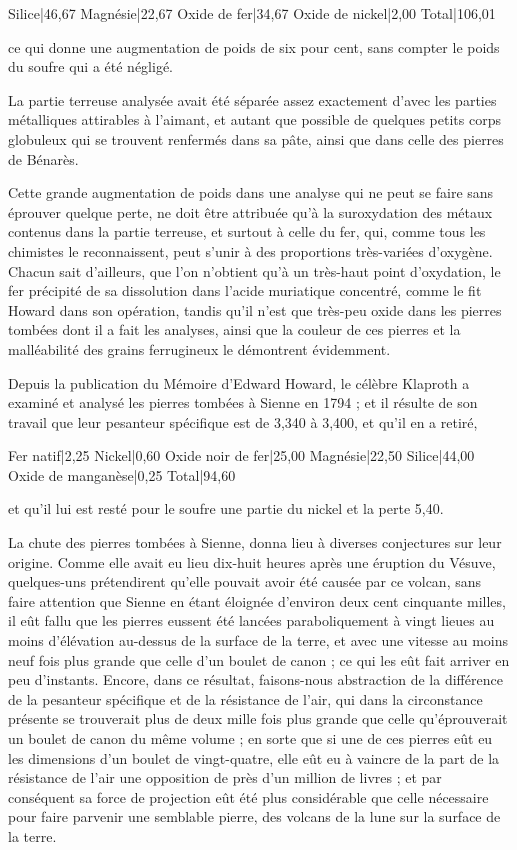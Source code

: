 \documentclass[a4paper, 12pt, oneside, french]{article}
\begin{document}
Silice|46,67  
Magnésie|22,67  
Oxide de fer|34,67  
Oxide de nickel|2,00  
Total|106,01

ce qui donne une augmentation de poids de six pour cent, sans compter le poids du soufre qui a été négligé.

La partie terreuse analysée avait été séparée assez exactement d'avec les parties métalliques attirables à l'aimant, et autant que possible de quelques petits corps globuleux qui se trouvent renfermés dans sa pâte, ainsi que dans celle des pierres de Bénarès.

Cette grande augmentation de poids dans une analyse qui ne peut se faire sans éprouver quelque perte, ne doit être attribuée qu'à la suroxydation des métaux contenus dans la partie terreuse, et surtout à celle du fer, qui, comme tous les chimistes le reconnaissent, peut s'unir à des proportions très-variées d'oxygène. Chacun sait d'ailleurs, que l'on n'obtient qu'à un très-haut point d'oxydation, le fer précipité de sa dissolution dans l'acide muriatique concentré, comme le fit Howard dans son opération, tandis qu'il n'est que très-peu oxide dans les pierres tombées dont il a fait les analyses, ainsi que la couleur de ces pierres et la malléabilité des grains ferrugineux le démontrent évidemment.

Depuis la publication du Mémoire d'Edward Howard, le célèbre Klaproth a examiné et analysé les pierres tombées à Sienne en 1794 ; et il résulte de son travail que leur pesanteur spécifique est de 3,340 à 3,400, et qu'il en a retiré,

Fer natif|2,25  
Nickel|0,60  
Oxide noir de fer|25,00  
Magnésie|22,50  
Silice|44,00  
Oxide de manganèse|0,25  
Total|94,60

et qu'il lui est resté pour le soufre une partie du nickel et la perte 5,40.

La chute des pierres tombées à Sienne, donna lieu à diverses conjectures sur leur origine. Comme elle avait eu lieu dix-huit heures après une éruption du Vésuve, quelques-uns prétendirent qu'elle pouvait avoir été causée par ce volcan, sans faire attention que Sienne en étant éloignée d'environ deux cent cinquante milles, il eût fallu que les pierres eussent été lancées paraboliquement à vingt lieues au moins d'élévation au-dessus de la surface de la terre, et avec une vitesse au moins neuf fois plus grande que celle d'un boulet de canon ; ce qui les eût fait arriver en peu d'instants. Encore, dans ce résultat, faisons-nous abstraction de la différence de la pesanteur spécifique et de la résistance de l'air, qui dans la circonstance présente se trouverait plus de deux mille fois plus grande que celle qu'éprouverait un boulet de canon du même volume ; en sorte que si une de ces pierres eût eu les dimensions d'un boulet de vingt-quatre, elle eût eu à vaincre de la part de la résistance de l'air une opposition de près d'un million de livres ; et par conséquent sa force de projection eût été plus considérable que celle nécessaire pour faire parvenir une semblable pierre, des volcans de la lune sur la surface de la terre.
\end{document}
